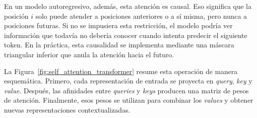 En un modelo autoregresivo, además, esta atención es causal. Eso significa que la posición $i$ solo puede atender a posiciones anteriores o a sí misma, pero nunca a posiciones futuras. Si no se impusiera esta restricción, el modelo podría ver información que todavía no debería conocer cuando intenta predecir el siguiente token. En la práctica, esta causalidad se implementa mediante una máscara triangular inferior que anula la atención hacia el futuro.

La Figura~\ref{fig:self_attention_transformer} resume esta operación de manera esquemática. Primero, cada representación de entrada se proyecta en \textit{query}, \textit{key} y \textit{value}. Después, las afinidades entre \textit{queries} y \textit{keys} producen una matriz de pesos de atención. Finalmente, esos pesos se utilizan para combinar los \textit{values} y obtener nuevas representaciones contextualizadas.

